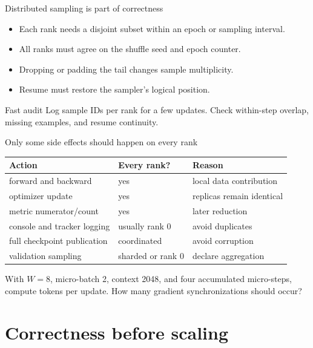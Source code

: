 \documentclass[handout]{beamer}
\begin{document}
\begin{frame}{Distributed sampling is part of correctness}
  \begin{itemize}
    \setlength{\itemsep}{8pt}
    \item Each rank needs a disjoint subset within an epoch or sampling interval.
    \item All ranks must agree on the shuffle seed and epoch counter.
    \item Dropping or padding the tail changes sample multiplicity.
    \item Resume must restore the sampler's logical position.
  \end{itemize}
  \begin{block}{Fast audit}
    Log sample IDs per rank for a few updates. Check within-step overlap, missing examples, and resume continuity.
  \end{block}
\end{frame}

\begin{frame}{Only some side effects should happen on every rank}
  \small
  \begin{tabular}{lll}
    \toprule
    Action & Every rank? & Reason \\
    \midrule
    forward and backward & yes & local data contribution \\
    optimizer update & yes & replicas remain identical \\
    metric numerator/count & yes & later reduction \\
    console and tracker logging & usually rank 0 & avoid duplicates \\
    full checkpoint publication & coordinated & avoid corruption \\
    validation sampling & sharded or rank 0 & declare aggregation \\
    \bottomrule
  \end{tabular}
\end{frame}

  {With $W=8$, micro-batch 2, context 2048, and four accumulated micro-steps, compute tokens per update. How many gradient synchronizations should occur?}

\section{Correctness before scaling}
\end{document}
